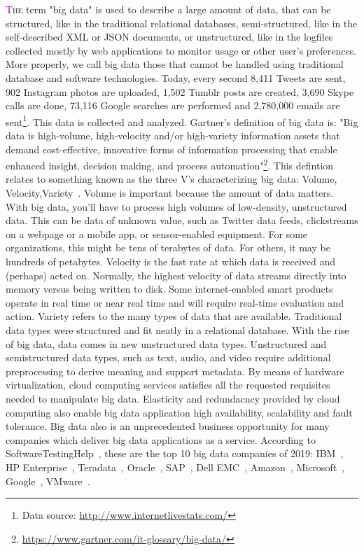 \lettrine[lines=4]{\textcolor{purple}{T}}{he} term "big data" is used to describe a large amount of data, that can be structured, like in the traditional relational databases, semi-structured, like in the self-described XML or JSON documents, or unstructured, like in the logfiles collected mostly by web applications to monitor usage or other user's preferences. More properly, we call big data those that cannot be handled using traditional database and software technologies. Today, every second 8,411 Tweets are sent, 902 Instagram photos are uploaded, 1,502 Tumblr posts are created, 3,690 Skype calls are done, 73,116 Google searches are performed and 2,780,000 emails are sent\footnote{Data source: \url{http://www.internetlivestats.com/}}. This data is collected and analyzed. Gartner's definition of big data is: "Big data is high-volume, high-velocity and/or high-variety information assets that demand cost-effective, innovative forms of information processing that enable enhanced insight, decision making, and process automation"\footnote{\url{https://www.gartner.com/it-glossary/big-data/}}. This defintion relates to something known as the three V's characterizing big data: Volume, Velocity,Variety~\cite{WhatIsBigData}. Volume is important because the amount of data matters. With big data, you’ll have to process high volumes of low-density, unstructured data. This can be data of unknown value, such as Twitter data feeds, clickstreams on a webpage or a mobile app, or sensor-enabled equipment. For some organizations, this might be tens of terabytes of data. For others, it may be hundreds of petabytes. Velocity is the fast rate at which data is received and (perhaps) acted on. Normally, the highest velocity of data streams directly into memory versus being written to disk. Some internet-enabled smart products operate in real time or near real time and will require real-time evaluation and action. Variety refers to the many types of data that are available. Traditional data types were structured and fit neatly in a relational database. With the rise of big data, data comes in new unstructured data types. Unstructured and semistructured data types, such as text, audio, and video require additional preprocessing to derive meaning and support metadata. By means of hardware virtualization, cloud computing services satisfies all the requested requisites needed to manipulate big data. Elasticity and redundacncy provided by cloud computing also enable big data application high availability, scalability and fault tolerance.
Big data also is an unprecedented business opportunity for many companies which  deliver big data applications as a service. According to  SoftwareTestingHelp~\cite{misc:BigDataCompanies}, these are the top 10 big data companies of 2019: IBM~\cite{misc:IBM}, HP Enterprise~\cite{misc:HPE}, Teradata~\cite{misc:Teradata}, Oracle~\cite{misc:Oracle}, SAP~\cite{misc:SAP}, Dell EMC~\cite{misc:EMC}, Amazon~\cite{misc:AWS}, Microsoft~\cite{misc:Microsoft}, Google~\cite{misc:Google}, VMware~\cite{misc:VMware}.

